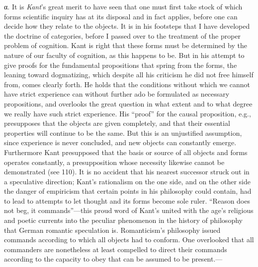 \documentclass[12pt,a4paper]{book}
\newcommand{\opage}[1]{\marginnote{\footnotesize\textit{[#1]}}}
\begin{document}
α. It is \emph{Kant}'s great merit to have seen that one must first take stock
of which forms scientific inquiry has at its disposal and in fact applies,
before one can decide how they relate to the objects. It is in his footsteps
that I have developed the doctrine of categories, before I passed over to the
treatment of the proper problem of cognition. Kant is right that these forms
must be determined by the nature of our faculty of cognition, as this happens
to be. But in his attempt to give proofs for the fundamental propositions that
spring from the forms, the leaning toward dogmatizing, which despite all his
criticism he did not free himself from, comes clearly forth. He holds that the
conditions without which we cannot have strict experience can without further
ado be formulated as necessary propositions, and overlooks the great question
in what extent and to what degree we really have such strict experience. His
``proof'' for the causal proposition, e.g., presupposes that the objects are
given completely, and that their essential properties will continue to be the
same. But this is an unjustified assumption, since experience is never
concluded, and new objects can constantly \opage{267}emerge. Furthermore Kant presupposed
that the basis or source of all objects and forms operates constantly, a
presupposition whose necessity likewise cannot be demonstrated (see 110). It is
no accident that his nearest successor struck out in a speculative direction;
Kant's rationalism on the one side, and on the other side the danger of
empiricism that certain points in his philosophy could contain, had to lead to
attempts to let thought and its forms become sole ruler. ``Reason does not beg,
it commands''---this proud word of Kant's united with the age's religious and
poetic currents into the peculiar phenomenon in the history of philosophy that
German romantic speculation is. Romanticism's philosophy issued commands
according to which all objects had to conform. One overlooked that all
commanders are nonetheless at least compelled to direct their commands
according to the capacity to obey that can be assumed to be present.---
\end{document}
